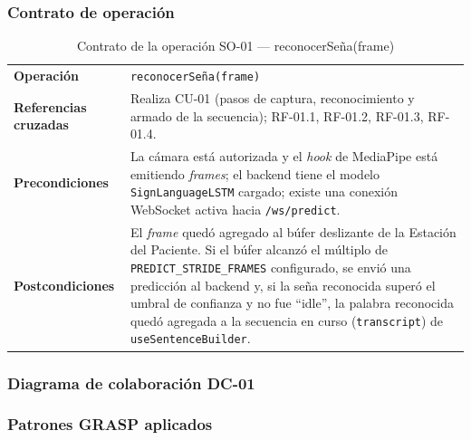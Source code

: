 \subsubsection{Contrato de operación}

\begin{table}[H]
\centering
\begin{tabularx}{\textwidth}{@{}p{4.4cm} X@{}}
\toprule
\textbf{Operación} & \texttt{reconocerSeña(frame)} \\
\textbf{Referencias cruzadas} & Realiza CU-01 (pasos de captura, reconocimiento
y armado de la secuencia); RF-01.1, RF-01.2, RF-01.3, RF-01.4. \\
\textbf{Precondiciones} & La cámara está autorizada y el \textit{hook} de
MediaPipe está emitiendo \textit{frames}; el backend tiene el modelo
\texttt{SignLanguageLSTM} cargado; existe una conexión WebSocket activa hacia
\texttt{/ws/predict}. \\
\textbf{Postcondiciones} & El \textit{frame} quedó agregado al búfer
deslizante de la Estación del Paciente. Si el búfer alcanzó el múltiplo de
\texttt{PREDICT\_STRIDE\_FRAMES} configurado, se envió una predicción al
backend y, si la seña reconocida superó el umbral de confianza y no fue
``idle'', la palabra reconocida quedó agregada a la secuencia en curso
(\texttt{transcript}) de \texttt{useSentenceBuilder}. \\
\bottomrule
\end{tabularx}
\caption{Contrato de la operación SO-01 --- reconocerSeña(frame)}
\label{tab:col-contrato-so01}
\end{table}

\subsubsection{Diagrama de colaboración DC-01}


\subsubsection{Patrones GRASP aplicados}

